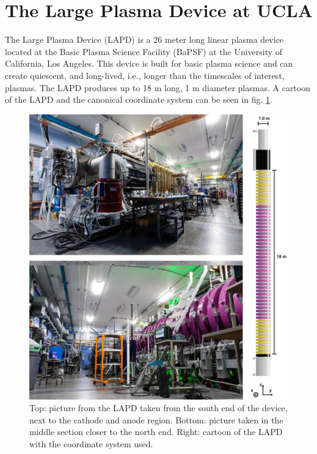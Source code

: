 \section{The Large Plasma Device at UCLA}

The Large Plasma Device (LAPD)\cite{gekelman_upgraded_2016,qian_design_2023} is a 26 meter long linear plasma device located at the Basic Plasma Science Facility (BaPSF) at the University of California, Los Angeles. This device is built for basic plasma science and can create quiescent, and long-lived, i.e., longer than the timescales of interest, plasmas. The LAPD produces up to 18 m long, 1 m diameter plasmas. A cartoon of the LAPD and the canonical coordinate system can be seen in fig. \ref{fig:lapd-pics}.

\begin{figure}
	\centering
	\includegraphics[width=400pt]{figures/lapd_pics.jpg}
	\caption[Pictures of the LAPD]{\label{fig:lapd-pics}Top: picture from the LAPD taken from the south end of the device, next to the cathode and anode region. Bottom: picture taken in the middle section closer to the north end. Right: cartoon of the LAPD with the coordinate system used.}
\end{figure}

